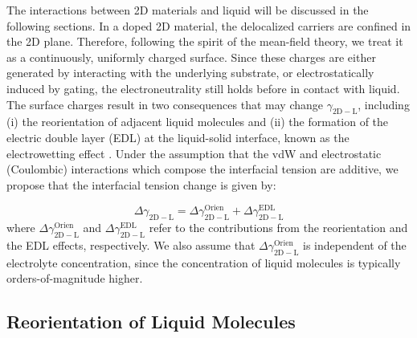 The interactions between 2D materials and liquid will be discussed in
the following sections. In a doped 2D material, the delocalized carriers
are confined in the 2D plane. Therefore, following the spirit of the
mean-field theory, we treat it as a continuously, uniformly charged
surface. Since these charges are either generated by interacting with
the underlying substrate, or electrostatically induced by gating, the
electroneutrality still holds before in contact with liquid.
%
The surface charges result in two consequences that may change
\(\gamma_{\mathrm{2D-L}}\), including (i) the reorientation of
adjacent liquid molecules \autocite{Ostrowski_2014_tunable} and (ii) the
formation of the electric double layer (EDL) at the liquid-solid
interface, known as the electrowetting effect
\autocite{Lippmann_1908,Mugele_2005_EW_rev}. Under the assumption that the
vdW and electrostatic (Coulombic) interactions which compose the
interfacial tension are additive, we propose that the interfacial
tension change is given by:

\begin{equation}
\label{eqn:wet-delta-gamma-decompose}
\Delta \gamma_{\mathrm{2D-L}} = \Delta \gamma_{\mathrm{2D-L}}^{\mathrm{Orien}}
                              + \Delta \gamma_{\mathrm{2D-L}}^{\mathrm{EDL}}
\end{equation}
where \(\Delta \gamma_{\mathrm{2D-L}}^{\mathrm{Orien}}\) and \(\Delta
\gamma_{\mathrm{2D-L}}^{\mathrm{EDL}}\) refer to the contributions
from the reorientation and the EDL effects, respectively.
%
We also
assume that \(\Delta \gamma_{\mathrm{2D-L}}^{\mathrm{Orien}}\) is independent of
the electrolyte concentration, since the concentration of liquid
molecules is typically orders-of-magnitude higher.



\subsection{Reorientation of Liquid Molecules}
\label{sec:wet-reorien}

